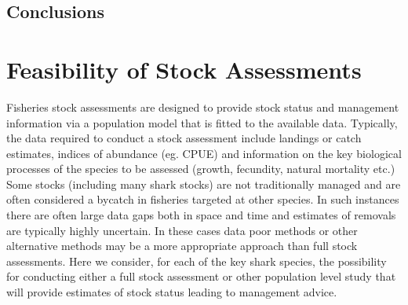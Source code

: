 \documentclass[12pt]{SCreport}
\begin{document}
            
\subsection{Conclusions}
      
 \clearpage     
      
\section{Feasibility of Stock Assessments}
Fisheries stock assessments are designed to provide stock status and management information via a population model that is fitted to the available data.  Typically, the data required to conduct a stock assessment include landings or catch estimates, indices of abundance (eg. CPUE) and information on the key biological processes of the species to be assessed (growth, fecundity, natural mortality etc.) Some stocks (including many shark stocks) are not traditionally managed and are often considered a bycatch in fisheries targeted at other species. In such instances there are often large data gaps both in space and time and estimates of removals are typically highly uncertain. In these cases data poor methods or other alternative methods may be a more appropriate approach than full stock assessments.  Here we consider, for each of the key shark species, the possibility for conducting either a full stock assessment or other population level study that will provide estimates of stock status leading to management advice.
\end{document}
